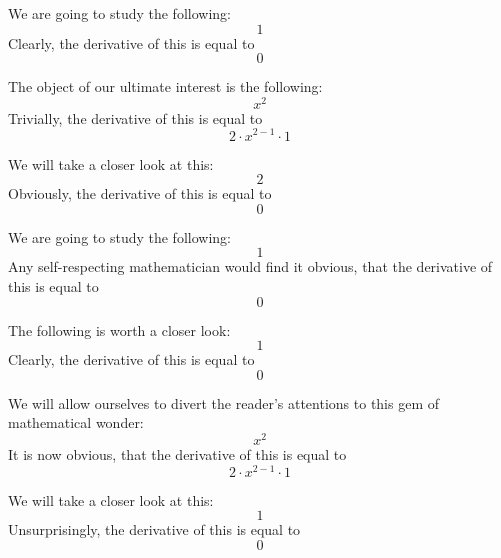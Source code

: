 \documentclass{article}
\begin{document}
We are going to study the following:
\begin{equation}
1 
\end{equation}
Clearly, the derivative of this is equal to
\begin{equation}
0 
\end{equation}

The object of our ultimate interest is the following:
\begin{equation}
x ^{2 } 
\end{equation}
Trivially, the derivative of this is equal to
\begin{equation}
2 \cdot x ^{2 - 1 } \cdot 1 
\end{equation}

We will take a closer look at this:
\begin{equation}
2 
\end{equation}
Obviously, the derivative of this is equal to
\begin{equation}
0 
\end{equation}

We are going to study the following:
\begin{equation}
1 
\end{equation}
Any self-respecting mathematician would find it obvious, that the derivative of this is equal to
\begin{equation}
0 
\end{equation}

The following is worth a closer look:
\begin{equation}
1 
\end{equation}
Clearly, the derivative of this is equal to
\begin{equation}
0 
\end{equation}

We will allow ourselves to divert the reader's attentions to this gem of mathematical wonder:
\begin{equation}
x ^{2 } 
\end{equation}
It is now obvious, that the derivative of this is equal to
\begin{equation}
2 \cdot x ^{2 - 1 } \cdot 1 
\end{equation}

We will take a closer look at this:
\begin{equation}
1 
\end{equation}
Unsurprisingly, the derivative of this is equal to
\begin{equation}
0 
\end{equation}
\end{document}
